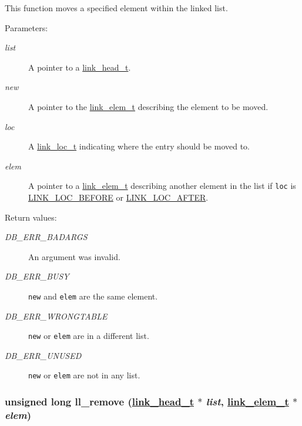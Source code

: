 This function moves a specified element within the linked list.\begin{Desc}
\item[Parameters: ]\par
\begin{description}
\item[{\em 
list}]A pointer to a \hyperlink{group__dbprim__link_a0}{link\_\-head\_\-t}. \item[{\em 
new}]A pointer to the \hyperlink{group__dbprim__link_a1}{link\_\-elem\_\-t} describing the element to be moved. \item[{\em 
loc}]A \hyperlink{group__dbprim__link_a4}{link\_\-loc\_\-t} indicating where the entry should be moved to. \item[{\em 
elem}]A pointer to a \hyperlink{group__dbprim__link_a1}{link\_\-elem\_\-t} describing another element in the list if {\tt loc} is \hyperlink{group__dbprim__link_a26a134}{LINK\_\-LOC\_\-BEFORE} or \hyperlink{group__dbprim__link_a26a135}{LINK\_\-LOC\_\-AFTER}.\end{description}
\end{Desc}
\begin{Desc}
\item[Return values: ]\par
\begin{description}
\item[{\em 
DB\_\-ERR\_\-BADARGS}]An argument was invalid. \item[{\em 
DB\_\-ERR\_\-BUSY}]{\tt new} and {\tt elem} are the same element. \item[{\em 
DB\_\-ERR\_\-WRONGTABLE}]{\tt new} or {\tt elem} are in a different list. \item[{\em 
DB\_\-ERR\_\-UNUSED}]{\tt new} or {\tt elem} are not in any list. \end{description}
\end{Desc}
\hypertarget{group__dbprim__link_a8}{
\subsubsection[ll\_\-remove]{\setlength{\rightskip}{0pt plus 5cm}unsigned long ll\_\-remove (\hyperlink{group__dbprim__link_a0}{link\_\-head\_\-t} $\ast$ {\em list}, \hyperlink{group__dbprim__link_a1}{link\_\-elem\_\-t} $\ast$ {\em elem})}}
\label{group__dbprim__link_a8}


